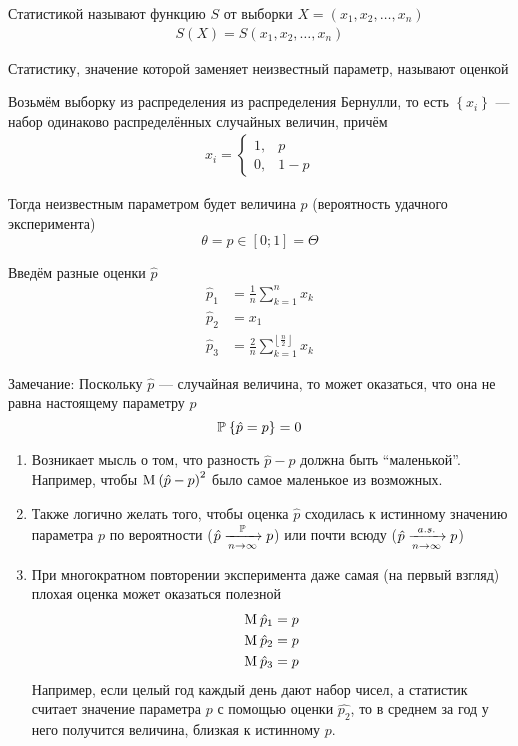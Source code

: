 \begin{definition}[Статистика]
  \label{def:statistic}
  Статистикой называют функцию $S$ от выборки
  $X=\left(x_1,x_2,\dots,x_n\right)$
  \begin{align*}
    S\left(X\right) = S\left(x_1, x_2, \dots, x_n\right)
  \end{align*}
\end{definition}
\begin{definition}[Оценка]Статистику,
  значение которой заменяет неизвестный параметр,
  называют оценкой
\end{definition}
\begin{example}\label{example:bernulliEstimator}
  Возьмём выборку из распределения из распределения Бернулли,
  то есть $\left\{x_i\right\}$ --- набор одинаково распределённых
  случайных величин, причём
  \begin{align*}
  x_i=
  \begin{cases}
    1,&p\\
    0,&1-p
  \end{cases}
  \end{align*}

  Тогда неизвестным параметром будет величина $p$
  (вероятность удачного эксперимента)
  $$\theta=p\in\left[0;1\right]=\Theta$$

  Введём разные оценки $\hat{p}$
  \begin{align*}
    \hat{p}_1&=\frac{1}{n}\sum_{k=1}^n x_k\\
    \hat{p}_2&=x_1\\
    \hat{p}_3&=
      \frac{2}{n}\sum_{k=1}^{\left\lfloor \frac{n}{2} \right\rfloor} x_k
  \end{align*}
\end{example}
Замечание:
Поскольку $\hat{p}$ --- случайная величина, то может оказаться,
что она не равна настоящему параметру $p$
$$\mathbb{P}_{{}}\left\{ \hat{p}=p \right\}=0$$
\begin{enumerate}
  \item Возникает мысль о том, что разность $\hat{p}-p$
    должна быть ``маленькой''. Например, чтобы
    $\operatorname{M}_{} \left(\hat{p}-p\right)^2$ было самое маленькое из возможных.
  \item Также логично желать того,
    чтобы оценка $\hat{p}$ сходилась к истинному значению параметра $p$
    по вероятности ($\hat{p}\xrightarrow[n\to\infty]{\mathbb{P}} p$)
    или почти всюду ($\hat{p}\xrightarrow[n\to\infty]{a.s.} p$)
  \item При многократном повторении эксперимента
    даже самая (на первый взгляд) плохая оценка может оказаться полезной
    \begin{align*}
      \operatorname{M}_{} \hat{p}_1=p\\
      \operatorname{M}_{} \hat{p}_2=p\\
      \operatorname{M}_{} \hat{p}_3=p
    \end{align*}
    Например, если целый год каждый день дают набор чисел,
    а статистик считает значение параметра $p$ с помощью оценки $\hat{p_2}$,
    то в среднем за год у него получится величина, близкая к истинному $p$.
\end{enumerate}

